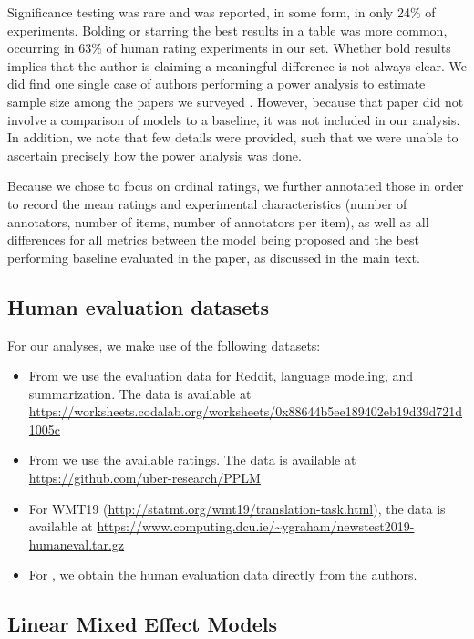 \documentclass[11pt,a4paper]{article}
\begin{document}
Significance testing was rare and was reported, in some form, in only 24\% of experiments. Bolding or starring the best results in a table was more common, occurring in 63\% of human rating experiments in our set. Whether bold results implies that the author is claiming a meaningful difference is not always clear. We did find one single case of authors performing a power analysis to estimate sample size among the papers we surveyed \citep{garbacea.2019}. However, because that paper did not involve a comparison of models to a baseline, it was not included in our analysis. In addition, we note that few details were provided, such that we were unable to ascertain precisely how the power analysis was done.

Because we chose to focus on ordinal ratings, we further annotated those in order to record the mean ratings and experimental characteristics (number of annotators, number of items, number of annotators per item), as well as all differences for all metrics between the model being proposed and the best performing baseline evaluated in the paper, as discussed in the main text.


\subsection{Human evaluation datasets}
\label{app:humandata}

For our analyses, we make use of the following datasets:
\begin{itemize}
    \item From \citet{hashimoto2019unifying} we use the evaluation data for Reddit, language modeling, and summarization. The data is available at \url{https://worksheets.codalab.org/worksheets/0x88644b5ee189402eb19d39d721d1005c}
    \item From \citet{dathathri.2020} we use the available ratings. The data is available at \url{https://github.com/uber-research/PPLM}
    \item For WMT19 (\url{http://statmt.org/wmt19/translation-task.html}), the data is available at \url{https://www.computing.dcu.ie/~ygraham/newstest2019-humaneval.tar.gz}
    \item For \citet{holtzman.2020}, we obtain the human evaluation data directly from the authors.
\end{itemize}

\subsection{Linear Mixed Effect Models}
\label{app:lmer}
\end{document}
